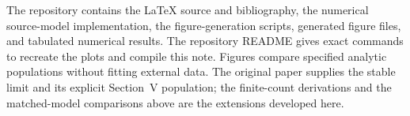 \documentclass[11pt]{article}
\begin{document}
The repository contains the LaTeX source and bibliography, the numerical
source-model implementation, the figure-generation scripts, generated figure
files, and tabulated numerical results. The repository README gives exact
commands to recreate the plots and compile this note. Figures compare
specified analytic populations without fitting external data. The original
paper supplies the stable limit and its explicit Section~V population; the
finite-count derivations and the matched-model comparisons above are the
extensions developed here.



\end{document}
